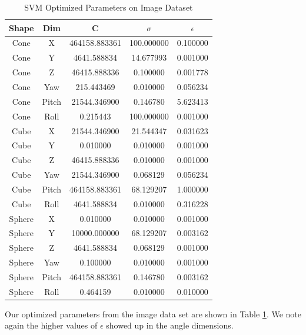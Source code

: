 \documentclass[journal]{IEEEtran}
\begin{document}
\begin{table}[h]
\caption{SVM Optimized Parameters on Image Dataset}
\label{SVM_Image_Parms}
\centering

\begin{tabular}{|c|c|c|c|c|}
\hline
Shape & Dim & C & $\sigma$ & $\epsilon$\\
\hline
Cone & X & 464158.883361 & 100.000000 & 0.100000\\
Cone & Y & 4641.588834 & 14.677993 & 0.001000\\
Cone & Z & 46415.888336 & 0.100000 & 0.001778\\
Cone & Yaw & 215.443469 & 0.010000 & 0.056234\\
Cone & Pitch & 21544.346900 & 0.146780 & 5.623413\\
Cone & Roll & 0.215443 & 100.000000 & 0.001000\\
\hline
Cube & X & 21544.346900 & 21.544347 & 0.031623\\
Cube & Y & 0.010000 & 0.010000 & 0.001000\\
Cube & Z & 46415.888336 & 0.010000 & 0.001000\\
Cube & Yaw & 21544.346900 & 0.068129 & 0.056234\\
Cube & Pitch & 464158.883361 & 68.129207 & 1.000000\\
Cube & Roll & 4641.588834 & 0.010000 & 0.316228\\
\hline
Sphere & X & 0.010000 & 0.010000 & 0.001000\\
Sphere & Y & 10000.000000 & 68.129207 & 0.003162\\
Sphere & Z & 4641.588834 & 0.068129 & 0.001000\\
Sphere & Yaw & 0.100000 & 0.010000 & 0.001000\\
Sphere & Pitch & 464158.883361 & 0.146780 & 0.003162\\
Sphere & Roll & 0.464159 & 0.010000 & 0.010000\\
\hline

\end{tabular}

\end{table}

Our optimized parameters from the image data set are shown in Table \ref{SVM_Image_Parms}.  We note again the higher values of $\epsilon$ showed up in the angle dimensions.
\end{document}
